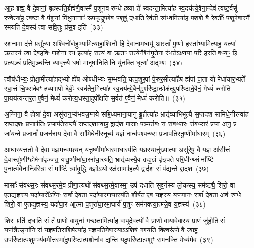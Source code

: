 आ॒ह॒ ब्रह्म॒ वै दे॒वानां॒ बृह॒स्पति॒र्ब्रह्म॑णै॒वास्मै॑ प॒शूनव॑ रुन्धे ह॒व्या ते᳚ स्वदन्ता॒मित्या॑ह स्व॒दय॑त्ये॒वैना॒न्देव॑ त्वष्ट॒र्वसु॑ र॒ण्वेत्या॑ह॒ त्वष्टा॒ वै प॑शू॒नां मि॑थु॒नानाꣳ॑ रूप॒कृद्रू॒पमे॒व प॒शुषु॑ दधाति॒ रेव॑ती॒ रम॑ध्व॒मित्या॑ह प॒शवो॒ वै रे॒वतीः᳚ प॒शूने॒वास्मै॑ रमयति दे॒वस्य॑ त्वा सवि॒तुः प्र॑स॒व इति॑~(३३)\ip

र॒श॒नामा द॑त्ते॒ प्रसू᳚त्या अ॒श्विनो᳚र्बा॒हुभ्या॒मित्या॑हा॒श्विनौ॒ हि दे॒वाना॑मध्व॒र्यू आस्तां᳚ पू॒ष्णो हस्ता᳚भ्या॒मित्या॑ह॒ यत्या॑ ऋ॒तस्य॑ त्वा देवहविः॒ पाशे॒ना र॑भ॒ इत्या॑ह स॒त्यं वा ऋ॒तꣳ स॒त्येनै॒वैन॑मृ॒तेना र॑भते\-ऽक्ष्ण॒या परि॑ हरति॒ वध्य॒ꣳ॒ हि प्र॒त्यञ्चं॑ प्रतिमु॒ञ्चन्ति॒ व्यावृ॑त्त्यै॒ धर्\mbox{}षा॒ मानु॑षा॒निति॒ नि यु॑नक्ति॒ धृत्या॑ अ॒द्भ्यः~(३४)\ip

त्वौष॑धीभ्यः॒ प्रोक्षा॒मीत्या॑हा॒द्भ्यो ह्ये॑ष ओष॑धीभ्यः स॒म्भव॑ति॒ यत्प॒शुर॒पां पे॒रुर॒सीत्या॑है॒ष ह्य॑पां पा॒ता यो मेधा॑यार॒भ्यते᳚ स्वा॒त्तं चि॒थ्सदे॑वꣳ ह॒व्यमापो॑ देवीः॒ स्वद॑तैन॒मित्या॑ह स्व॒दय॑त्ये॒वैन॑मु॒परि॑ष्टा॒त्प्रोक्ष॑त्यु॒परि॑ष्टादे॒वैनं॒ मेध्यं॑ करोति पा॒यय॑त्यन्तर॒त ए॒वैनं॒ मेध्यं॑ करोत्य॒धस्ता॒दुपो᳚क्षति स॒र्वत॑ ए॒वैनं॒ मेध्यं॑ करोति॥~(३५)\ip

{\anuvakamend[{वसू॒निति॑ प्रस॒व इत्य॒द्भ्यो᳚\-ऽन्तर॒त ए॒वैन॒न्दश॑ च}]}

अ॒ग्निना॒ वै होत्रा॑ दे॒वा असु॑रान॒भ्य॑भवन्न॒ग्नये॑ समि॒ध्यमा॑ना॒यानु॑ ब्रू॒हीत्या॑ह॒ भ्रातृ॑व्याभिभूत्यै स॒प्तद॑श सामिधे॒नीरन्वा॑ह सप्तद॒शः प्र॒जा\-प॑तिः प्र॒जा\-प॑ते॒राप्त्यै॑ स॒प्तद॒शान्वा॑ह॒ द्वाद॑श॒ मासाः॒ पञ्च॒र्तवः॒ स सं॑वथ्स॒रः सं॑वथ्स॒रं प्र॒जा अनु॒ प्र जा॑यन्ते प्र॒जानां᳚ प्र॒जन॑नाय दे॒वा वै सा॑मिधे॒नीर॒नूच्य॑ य॒ज्ञं नान्व॑पश्य॒न्थ्स प्र॒जा\-प॑तिस्तू॒ष्णीमा॑घा॒रम्~(३६)\ip

आघा॑रय॒त्ततो॒ वै दे॒वा य॒ज्ञमन्व॑पश्य॒न्॒ यत्तू॒ष्णीमा॑घा॒रमा॑घा॒रय॑ति य॒ज्ञस्यानु॑ख्यात्या॒ असु॑रेषु॒ वै य॒ज्ञ आ॑सी॒त्तं दे॒वास्तू᳚ष्णीꣳहो॒मेना॑वृञ्जत॒ यत्तू॒ष्णीमा॑घा॒रमा॑घा॒रय॑ति॒ भ्रातृ॑व्यस्यै॒व तद्य॒ज्ञं वृ॑ङ्क्ते परि॒धीन्थ्सं मा᳚र्ष्टि पु॒नात्ये॒वैना॒न्त्रिस्त्रिः॒ सं मा᳚र्ष्टि॒ त्र्या॑वृ॒द्धि य॒ज्ञो\-ऽथो॒ रक्ष॑सा॒मप॑हत्यै॒ द्वाद॑श॒ सं प॑द्यन्ते॒ द्वाद॑श~(३७)\ip

मासाः᳚ संवथ्स॒रः सं॑वथ्स॒रमे॒व प्री॑णा॒त्यथो॑ संवथ्स॒रमे॒वास्मा॒ उप॑ दधाति सुव॒र्गस्य॑ लो॒कस्य॒ सम॑ष्ट्यै॒ शिरो॒ वा ए॒तद्य॒ज्ञस्य॒ यदा॑घा॒रो᳚\-ऽग्निः सर्वा॑ दे॒वता॒ यदा॑घा॒रमा॑घा॒रय॑ति शीर्\mbox{}ष॒त ए॒व य॒ज्ञस्य॒ यज॑मानः॒ सर्वा॑ दे॒वता॒ अव॑ रुन्धे॒ शिरो॒ वा ए॒तद्य॒ज्ञस्य॒ यदा॑घा॒र आ॒त्मा प॒शुरा॑घा॒रमा॒घार्य॑ प॒शुꣳ सम॑नक्त्या॒त्मन्ने॒व य॒ज्ञस्य॑~(३८)\ip

शिरः॒ प्रति॑ दधाति॒ सं ते᳚ प्रा॒णो वा॒युना॑ गच्छता॒मित्या॑ह वायुदेव॒त्यो॑ वै प्रा॒णो वा॒यावे॒वास्य॑ प्रा॒णं जु॑होति॒ सं यज॑त्रै॒रङ्गा॑नि॒ सं य॒ज्ञप॑तिरा॒शिषेत्या॑ह य॒ज्ञप॑तिमे॒वास्या॒\-ऽऽ\-शिषं॑ गमयति वि॒श्वरू॑पो॒ वै त्वा॒ष्ट्र उ॒परि॑ष्टात्प॒शुम॒भ्य॑वमी॒त्तस्मा॑दु॒परि॑ष्टात्प॒शोर्नाव॑ द्यन्ति॒ यदु॒परि॑ष्टात्प॒शुꣳ स॑म॒नक्ति॒ मेध्य॑मे॒व~(३९)\ip

